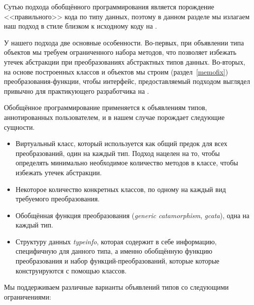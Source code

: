 


Сутью подхода обобщённого программирования является порождение <<правильного>> кода по типу данных, поэтому в данном разделе мы излагаем наш подход 
в стиле близком к исходному коду на \ocaml{}.


У нашего подхода две  основные особенности. Во-первых, при объявлении типа объектов мы требуем ограниченного набора методов, что позволяет избежать утечек абстракции при преобразованиях абстрактных типов данных. Во-вторых, на основе построенных классов и объектов мы строим (раздел~\ref{memofix}) преобразования-функции, чтобы интерфейс, предоставляемый подходом выглядел привычно для практикующего разработчика на \ocaml{}.

Обобщённое программирование применяется к объявлениям типов, аннотированных пользователем, и в нашем случае порождает следующие сущности.

\begin{itemize}
\item Виртуальный класс, который используется как общий предок для всех преобразований, один на каждый тип. Подход нацелен на то, чтобы определять минимально необходимое количество методов в классе, чтобы избежать утечек абстракции.
\item Некоторое количество конкретных классов, по одному на каждый вид требуемого преобразования. 

\item Обобщённая функция преобразования (\emph{generic catamorphism}, \emph{gcata}), одна на каждый тип.
\item Структуру данных \emph{typeinfo}, которая содержит в себе информацию, специфичную для данного типа, а именно обобщённую функцию преобразования и набор функций-преобразований, которые которые конструируются с помощью классов.
\end{itemize}




Мы поддерживаем различные варианты объявлений типов со следующими ограничениями:

